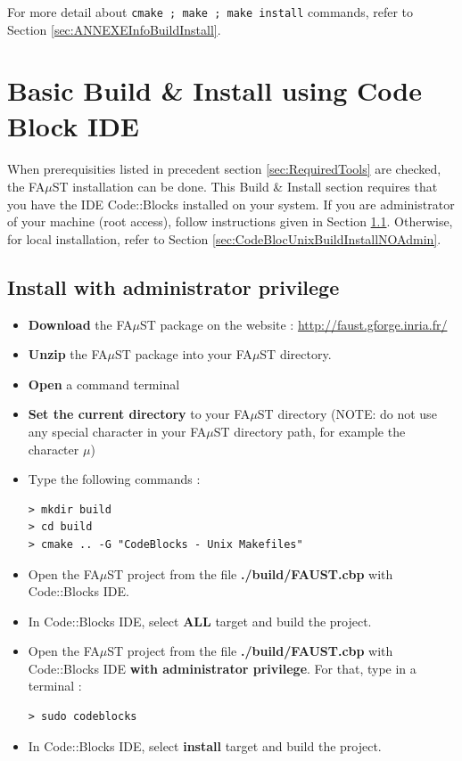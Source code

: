 For more detail about \texttt{cmake ; make ; make install} commands, refer to Section \ref{sec:ANNEXEInfoBuildInstall}.




\section{Basic Build \& Install using Code Block IDE}\label{sec:UnixInstallCodeBlock}
\paragraph{}When prerequisities listed in precedent section \ref{sec:RequiredTools} are checked, the FA$\mu$ST installation can be done. This Build \& Install section requires that you have the IDE Code::Blocks installed on your system. If you are administrator of your machine (root access), follow instructions given in Section \ref{sec:CodeBlocUnixBuildInstallAdmin}. Otherwise, for local installation, refer to Section \ref{sec:CodeBlocUnixBuildInstallNOAdmin}. 

\subsection{Install with administrator privilege}\label{sec:CodeBlocUnixBuildInstallAdmin}
\begin{itemize}
\item \textbf{Download} the FA$\mu$ST package on the website :  \url{http://faust.gforge.inria.fr/}
\item \textbf{Unzip} the FA$\mu$ST package into your FA$\mu$ST directory.
\item \textbf{Open} a command terminal
\item \textbf{Set the current directory} to your FA$\mu$ST directory (NOTE: do not use any special character in your FA$\mu$ST directory path, for example the character $\mu$)
\item Type the following commands : 
\begin{lstlisting}
> mkdir build
> cd build
> cmake .. -G "CodeBlocks - Unix Makefiles"
\end{lstlisting}

\item Open the FA$\mu$ST project from the file \textbf{./build/FAUST.cbp} with Code::Blocks IDE. 
\item In Code::Blocks IDE, select \textbf{ALL} target and build the project. 
\item Open the FA$\mu$ST project from the file \textbf{./build/FAUST.cbp} with Code::Blocks IDE \textbf{with administrator privilege}. For that, type in a terminal :
\begin{lstlisting}
> sudo codeblocks
\end{lstlisting}
\item In Code::Blocks IDE, select \textbf{install} target and build the project. 
\end{itemize}

